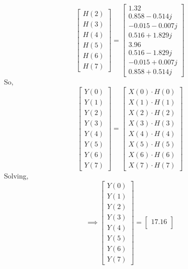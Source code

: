 \documentclass[journal,12pt,twocolumn]{IEEEtran}
\renewcommand\thesection{\arabic{section}}
\begin{document}
\begin{enumerate}[label=\thesection.\arabic*.,ref=\thesection.\theenumi]
\begin{equation}
\begin{bmatrix}
H(2) \\
H(3) \\
H(4) \\
H(5) \\
H(6) \\
H(7)
\end{bmatrix}
=
\begin{bmatrix}
1.32 \\
0.858 - 0.514j \\
-0.015-0.007j \\
0.516 +1.829j \\
3.96 \\
0.516 - 1.829j \\
-0.015+0.007j  \\
0.858 + 0.514j
\end{bmatrix}
\end{equation}
So,
\begin{equation}
\begin{bmatrix} 
Y(0) \\ Y(1) \\ Y(2) \\ Y(3) \\ Y(4) \\ Y(5) \\ Y(6) \\ Y(7) 
\end{bmatrix}
=
\begin{bmatrix}
X(0)\cdot H(0) \\ X(1)\cdot H(1) \\ X(2)\cdot H(2) \\ X(3)\cdot H(3) \\ X(4)\cdot H(4) \\ X(5)\cdot H(5) \\ X(6)\cdot H(6) \\ X(7)\cdot H(7)
\end{bmatrix}
\end{equation}
Solving,
\begin{equation}
\implies
\begin{bmatrix}
Y(0) \\
Y(1) \\
Y(2) \\
Y(3) \\
Y(4) \\
Y(5) \\
Y(6) \\
Y(7)
\end{bmatrix}
=
\begin{bmatrix}
17.16 \\

\end{bmatrix}
\end{equation}
\end{enumerate}
\end{document}
